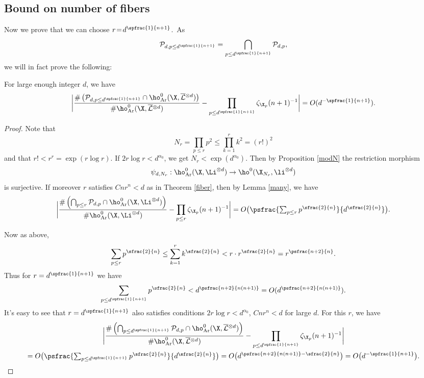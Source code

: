 \subsection{Bound on number of fibers}\mbox{}%
\!Now we prove that we can choose \hbox{$r\!=\!d^{\spfrac{1}{n+1}}$.~As}
\[
\mathcal{P}_{d, p\leq d^{\spfrac{1}{n+1}}}=\bigcap_{p\leq d^{\spfrac{1}{n+1}}}\mathcal{P}_{d,p},
\]
we will in fact prove the following:
\begin{lem}\label{br}
For large enough integer $d$, we have
\[
\biggl| \frac{\#\left(\mathcal{P}_{d, p\leq d^{\spfrac{1}{n+1}}}\cap \ho^0_{\mathrm{Ar}}(\X, \overline{\mathcal{L}}{}^{\otimes d})\right)}{\#\ho^0_{\mathrm{Ar}}(\X, \overline{\mathcal{L}}{}^{\otimes d})} -\prod_{p\leq d^{\spfrac{1}{n+1}}}\zeta_{\X_p}(n+1)^{-1} \biggr|=O(d^{-\spfrac{1}{n+1}}).
\]
\end{lem}
\begin{proof}
Note that
\[
N_r=\prod_{p\leq r}p^2\leq \prod_{k=1}^r k^2=(r!)^2
\]
and that $r!< r^r=\exp(r\log r)$. If $2r\log r<d^{\alpha_0}$, we get $N_r< \exp(d^{\alpha_0})$. Then by Proposition \ref{modN} the restriction morphism
\[
\psi_{d,N_r}: \ho^0_{\mathrm{Ar}}(\X,\Li^{\otimes d}) \to \ho^0(\X_{N_r},\li^{\otimes d})
\]
is surjective. If moreover $r$ satisfies $Cnr^n<d$ as in Theorem \ref{fiber}, then by Lemma \ref{many}, we have
\[
\biggl| \frac{\#\left(\bigcap_{p\leq r}\mathcal{P}_{d,p}\cap \ho^0_{\mathrm{Ar}}(\X, \Li^{\otimes d})\right)}{\#\ho^0_{\mathrm{Ar}}(\X, \Li^{\otimes d})} -\prod_{p\leq r}\zeta_{\X_p}(n+1)^{-1} \biggr| =O\bigl(\psfrac{\textstyle\sum_{p\leq r} p^{\sfrac{2}{n}}}{d^{\sfrac{2}{n}}} \bigr).
\]

Now as above,
\begin{align*}
\sum_{p\leq r}p^{\sfrac{2}{n}} \leq \sum_{k=1}^r k^{\sfrac{2}{n}} < r\cdot r^{\sfrac{2}{n}}= r^{\psfrac{n+2}{n}}.
\end{align*}
Thus for $r=d^{\spfrac{1}{n+1}}$ we have
\[
\sum_{p\leq d^{\spfrac{1}{n+1}}}p^{\sfrac{2}{n}}<d^{\psfrac{n+2}{n(n+1)}}=O(d^{\psfrac{n+2}{n(n+1)}}).
\]
It's easy to see that $r=d^{\spfrac{1}{n+1}}$ also satisfies conditions $2r\log r<d^{\alpha_0}$, $Cnr^n<d$ for large $d$. For this $r$, we have
\begin{multline*}
\biggl| \frac{\#\left(\bigcap_{p\leq d^{\spfrac{1}{n+1}}}\mathcal{P}_{d,p}\cap \ho^0_{\mathrm{Ar}}(\X, \overline{\mathcal{L}}{}^{\otimes d})\right)}{\#\ho^0_{\mathrm{Ar}}(\X, \overline{\mathcal{L}}{}^{\otimes d})} -\prod_{p\leq d^{\spfrac{1}{n+1}}}\zeta_{\X_p}(n+1)^{-1} \biggr|\\
=O\bigl(\psfrac{\textstyle\sum_{p\leq d^{\spfrac{1}{n+1}}}p^{\sfrac{2}{n}}}{d^{\sfrac{2}{n}}} \bigr)
=O\bigl(d^{\psfrac{n+2}{n(n+1)}-\sfrac{2}{n}}\bigr)=O\bigl(d^{-\spfrac{1}{n+1}}\bigr).
\end{multline*}
\end{proof}

